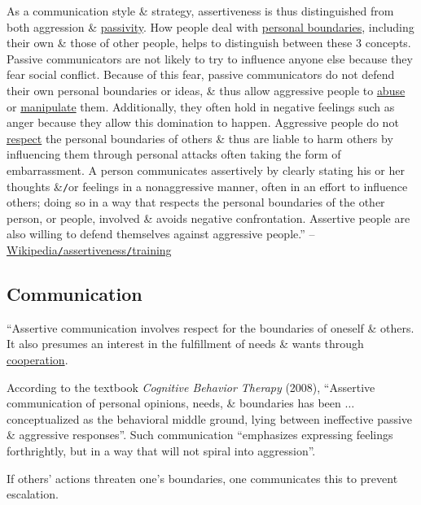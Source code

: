 \documentclass[oneside]{book}
\numberwithin{equation}{section}
\begin{document}
As a communication style \& strategy, assertiveness is thus distinguished from both aggression \& \href{https://en.wikipedia.org/wiki/Passivity_(behavior)}{passivity}. How people deal with \href{https://en.wikipedia.org/wiki/Personal_boundaries}{personal boundaries}, including their own \& those of other people, helps to distinguish between these 3 concepts. Passive communicators are not likely to try to influence anyone else because they fear social conflict. Because of this fear, passive communicators do not defend their own personal boundaries or ideas, \& thus allow aggressive people to \href{https://en.wikipedia.org/wiki/Abuse}{abuse} or \href{https://en.wikipedia.org/wiki/Psychological_manipulation}{manipulate} them. Additionally, they often hold in negative feelings such as anger because they allow this domination to happen. Aggressive people do not \href{https://en.wikipedia.org/wiki/Respect}{respect} the personal boundaries of others \& thus are liable to harm others by influencing them through personal attacks often taking the form of embarrassment. A person communicates assertively by clearly stating his or her thoughts \&\texttt{/}or feelings in a nonaggressive manner, often in an effort to influence others; doing so in a way that respects the personal boundaries of the other person, or people, involved \& avoids negative confrontation. Assertive people are also willing to defend themselves against aggressive people.'' -- \href{https://en.wikipedia.org/wiki/Assertiveness#Training}{Wikipedia\texttt{/}assertiveness\texttt{/}training}

\subsection{Communication}
``Assertive communication involves respect for the boundaries of oneself \& others. It also presumes an interest in the fulfillment of needs \& wants through \href{https://en.wikipedia.org/wiki/Cooperation}{cooperation}.

According to the textbook \textit{Cognitive Behavior Therapy} (2008), ``Assertive communication of personal opinions, needs, \& boundaries has been $\ldots$ conceptualized as the behavioral middle ground, lying between ineffective passive \& aggressive responses''. Such communication ``emphasizes expressing feelings forthrightly, but in a way that will not spiral into aggression''.

If others' actions threaten one's boundaries, one communicates this to prevent escalation.
\end{document}
